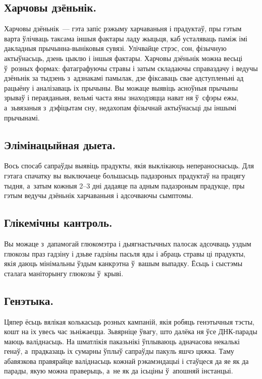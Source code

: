 \subsection{Харчовы дзёньнік.}
Харчовы дзёньнік~--- гэта запіс рэжыму харчаваньня і прадуктаў, пры гэтым варта ўлічваць таксама іншыя фактары ладу жыцьця, каб усталяваць паміж імі дакладныя прычынна-выніковыя сувязі. Улічвайце стрэс, сон, фізычную актыўнасьць, дзень цыклю і іншыя фактары. Харчовы дзёньнік можна весьці ў~розных формах: фатаграфуючы стравы і затым складаючы справаздачу і ведучы дзёньнік за тыдзень з~адзнакамі памылак, дзе фіксаваць свае адступленьні ад рацыёну і аналізаваць іх прычыны. Вы можаце выявіць асноўныя прычыны зрываў і пераяданьня, вельмі часта яны знаходзяцца нават ня ў~сфэры ежы, а~зьвязаныя з~дэфіцытам сну, недахопам фізычнай актыўнасьці ды іншымі прычынамі.


\subsection{Элімінацыйная дыета.}
Вось спосаб сапраўды выявіць прадукты, якія выклікаюць непераноснасьць. Для гэтага спачатку вы выключаеце большасьць падазроных прадуктаў на працягу тыдня, а~затым кожныя 2--3 дні дадаяце па адным падазроным прадукце, пры гэтым ведучы дзёньнік харчаваньня і адсочваючы сымптомы.

\subsection{Глікемічны кантроль.}
Вы можаце з~дапамогай глюкомэтра і дыягнастычных палосак адсочваць уздым глюкозы праз гадзіну і дзьве гадзіны пасьля яды і абраць стравы ці прадукты, якія даюць мінімальны ўздым канкрэтна ў~вашым выпадку. Ёсьць і сыстэмы сталага маніторынгу глюкозы ў~крыві.

\subsection{Генэтыка.}
Цяпер ёсьць вялікая колькасьць розных кампаній, якія робяць генэтычныя тэсты, кошт на іх увесь час зьніжаецца. Зьвярніце ўвагу, што далёка ня ўсе ДНК-парады маюць валіднасьць. На шматлікія паказьнікі ўплываюць адначасова некалькі генаў, а~прадказаць іх сумарны ўплыў сапраўды пакуль яшчэ цяжка. Таму абавязкова правярайце валіднасьць кожнай рэкамэндацыі і стаўцеся да яе як да парады, якую можна праверыць, а~не як да ісьціны ў~апошняй інстанцыі.

